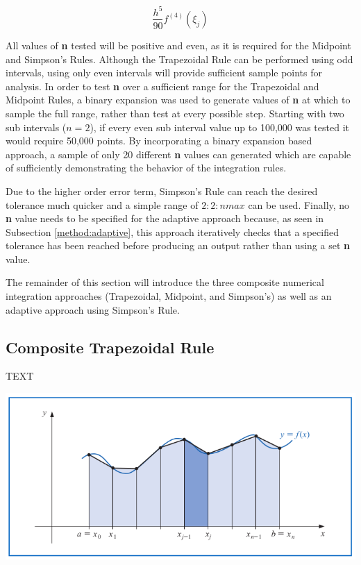 \documentclass[a4paper]{article}
\begin{document}
\begin{equation}
\frac{h^5}{90}f^{(4)}(\xi_j)
\label{sim_err}
\end{equation}

All values of \textbf{n} tested will be positive and even, as it is required for the Midpoint and Simpson's Rules. Although the Trapezoidal Rule can be performed using odd intervals, using only even intervals will provide sufficient sample points for analysis. In order to test \textbf{n} over a sufficient range for the Trapezoidal and Midpoint Rules, a binary expansion was used to generate values of \textbf{n} at which to sample the full range, rather than test at every possible step. Starting with two sub intervals ($n=2$), if every even sub interval value up to 100,000 was tested it would require 50,000 points. By incorporating a binary expansion based approach, a sample of only 20 different \textbf{n} values can generated which are capable of sufficiently demonstrating the behavior of the integration rules.

Due to the higher order error term, Simpson's Rule can reach the desired tolerance much quicker and a simple range of $2:2:nmax$ can be used. Finally, no \textbf{n} value needs to be specified for the adaptive approach because, as seen in Subsection \ref{method:adaptive}, this approach iteratively checks that a specified tolerance has been reached before producing an output rather than using a set \textbf{n} value.

The remainder of this section will introduce the three composite numerical integration approaches (Trapezoidal, Midpoint, and Simpson's) as well as an adaptive approach using Simpson's Rule.


\subsection{Composite Trapezoidal Rule}\label{method:trapezoidal}
TEXT

\begin{center}

	\includegraphics[width=1\textwidth]{../additional/trapezoidal_fig.png}
	\label{trap_fig}
\end{center}
\end{document}
